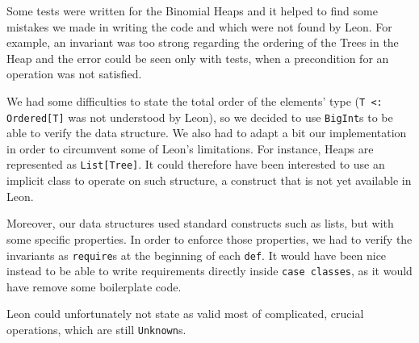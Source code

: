 Some tests were written for the Binomial Heaps and 
it helped to find some mistakes we made in writing the code and 
which were not found by Leon.
For example, an invariant was too strong regarding the ordering of the Trees in the Heap and 
the error could be seen only with tests,
when a precondition for an operation was not satisfied.

We had some difficulties to state the total order of the elements' type
(\texttt{T <: Ordered[T]} was not understood by Leon), 
so we decided to use \verb|BigInt|s to be able to verify the data structure.
We also had to adapt a bit our implementation in order to circumvent some of Leon's limitations.
For instance, Heaps are represented as \texttt{List[Tree]}. 
It could therefore have been interested to use an implicit class to operate on such structure, 
a construct that is not yet available in Leon.

Moreover, our data structures used standard constructs such as lists, 
but with some specific properties. 
In order to enforce those properties, 
we had to verify the invariants as \texttt{require}s at the beginning of each \texttt{def}. 
It would have been nice instead to be able to write requirements directly inside \texttt{case classes}, 
as it would have remove some boilerplate code.

Leon could unfortunately not state as valid most of complicated, crucial operations, 
which are still \verb|Unknown|s.